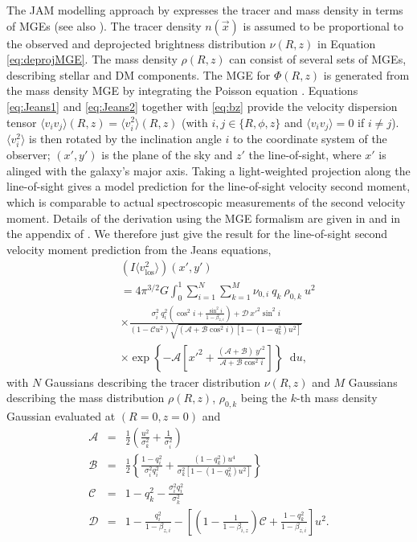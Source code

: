 \documentclass[useAMS,usenatbib]{mnras}
\newcommand*\diff{\mathop{}\!\mathrm{d}}
\newcommand{\vect}[1]{\vec{#1}} %
\begin{document}
The JAM modelling approach by \citet{Cap08} expresses the tracer and mass density in terms of MGEs (see also \citealt{1994A&A...285..723E}). The tracer density $n(\vect{x})$ is assumed to be proportional to the observed and deprojected brightness distribution $\nu(R,z)$ in Equation \eqref{eq:deprojMGE}. The mass density $\rho(R,z)$ can consist of several sets of MGEs, describing stellar and DM components. The MGE for $\Phi(R,z)$ is generated from the mass density MGE by integrating the Poisson equation \citep{1994A&A...285..723E}. Equations \eqref{eq:Jeans1} and \eqref{eq:Jeans2} together with \eqref{eq:bz} provide the velocity dispersion tensor $\langle v_i v_j \rangle(R,z) = \langle v_i^2 \rangle(R,z)$ (with $i,j \in \{ R,\phi, z\}$ and $\langle v_i v_j \rangle=0$ if $i\neq j$). $\langle v_i^2 \rangle$ is then rotated by the inclination angle $i$ to the coordinate system of the observer; $(x',y')$ is the plane of the sky and $z'$ the line-of-sight, where $x'$ is alinged with the galaxy's major axis. Taking a light-weighted projection along the line-of-sight gives a model prediction for the line-of-sight velocity second moment, which is comparable to actual spectroscopic measurements of the second velocity moment. Details of the derivation using the MGE formalism are given in \citet{Cap08} and in the appendix of \citet{GlennEC}. We therefore just give the result for the line-of-sight second velocity moment prediction from the Jeans equations,
\begin{eqnarray}
&&\left(I \langle v_\text{los}^2\rangle\right)(x',y')\nonumber\\
&&= 4 \pi^{3/2} G \int_0^1 \sum_{i=1}^N \sum_{k=1}^M \nu_{0,i} \ q_k \ \rho_{0,k} \ u^2\nonumber\\
&& \times \frac{\sigma_i^2 \ q^{2}_i \left( \cos^2 i + \frac{\sin^2 i}{1-\beta_{z,i}}\right) + \mathscr{D} \  {x'}^{2} \sin^2 i}{(1-\mathscr{C}u^2) \sqrt{(\mathscr{A} + \mathscr{B} \cos^2 i) \left[1-(1-q^{2}_k) u^2 \right]}}\nonumber\\
&& \times \exp\left\{- \mathscr{A} \left[{x'}^{2} + \frac{(\mathscr{A}+\mathscr{B}) \ {y'}^{2}}{\mathscr{A}+\mathscr{B}\cos^2 i}\right] \right\} \diff u, \label{eq:explicitLOSvelCap}
\end{eqnarray}
with $N$ Gaussians describing the tracer distribution $\nu(R,z)$ and $M$ Gaussians describing the mass distribution $\rho(R,z)$, $\rho_{0,k}$ being the $k$-th mass density Gaussian evaluated at $(R=0,z=0)$ and
\begin{eqnarray*}
\mathscr{A} &=& \frac 12 \left(\frac{u^2}{\sigma_k^2} + \frac{1}{\sigma_i^2} \right)\nonumber\\
\mathscr{B} &=& \frac 12 \left\{\frac{1-q^{2}_i}{\sigma_i^2 q^{2}_i} + \frac{(1-q^{2}_k)u^4}{\sigma_k^2 \left[1-(1-{q}_k^{2})u^2 \right]} \right\}\nonumber\\
\mathscr{C} &=& 1- q^{2}_k - \frac{\sigma_i^2 q^{2}_i}{\sigma^2_k}\nonumber\\
\mathscr{D} &=& 1 - \frac{q^{2}_i}{1-\beta_{z,i}} - \left[ \left(1-\frac{1}{1-\beta_{i,z}}\right)\mathscr{C} + \frac{1-q^{2}_k}{1-\beta_{z,i}}\right] u^2.\nonumber
\end{eqnarray*}
\end{document}
